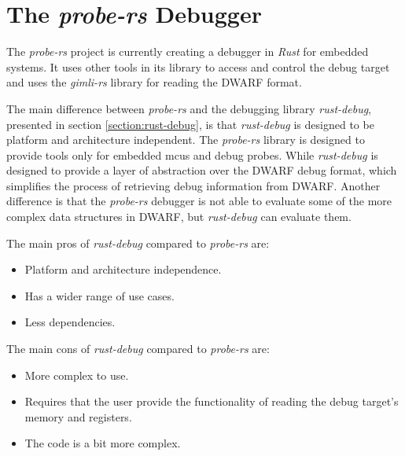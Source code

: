 \section{The \emph{probe-rs} Debugger}

The \emph{probe-rs} project is currently creating a debugger in \emph{Rust} for embedded systems.
It uses other tools in its library to access and control the debug target and uses the \emph{gimli-rs} library for reading the \gls{DWARF} format.


The main difference between \emph{probe-rs} and the debugging library \emph{rust-debug}, presented in section \ref{section:rust-debug}, is that \emph{rust-debug} is designed to be platform and architecture independent.
The \emph{probe-rs} library is designed to provide tools only for embedded \glspl{mcu} and debug probes.
While \emph{rust-debug} is designed to provide a layer of abstraction over the \gls{DWARF} debug format, which simplifies the process of retrieving debug information from \gls{DWARF}.
Another difference is that the \emph{probe-rs} debugger is not able to evaluate some of the more complex data structures in \gls{DWARF}, but \emph{rust-debug} can evaluate them.

The main pros of \emph{rust-debug} compared to \emph{probe-rs} are:
\begin{itemize}
  \item Platform and architecture independence.
  \item Has a wider range of use cases.
  \item Less dependencies.
\end{itemize}

The main cons of \emph{rust-debug} compared to \emph{probe-rs} are:
\begin{itemize}
  \item More complex to use.
  \item Requires that the user provide the functionality of reading the debug target's memory and registers.
  \item The code is a bit more complex.
\end{itemize}





